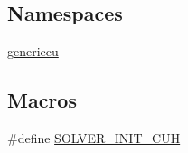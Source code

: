\subsection*{Namespaces}
\begin{DoxyCompactItemize}
\item 
 \hyperlink{namespacegenericcu}{genericcu}
\end{DoxyCompactItemize}
\subsection*{Macros}
\begin{DoxyCompactItemize}
\item 
\#define \hyperlink{solver__init_8cuh_a6476a3e2130c9d369a9f7f65aaf5721e}{S\+O\+L\+V\+E\+R\+\_\+\+I\+N\+I\+T\+\_\+\+C\+UH}
\end{DoxyCompactItemize}
